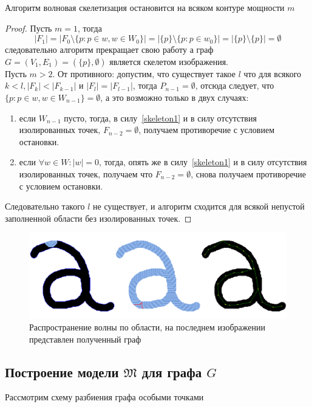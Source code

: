 \begin{state} 
Алгоритм волновая скелетизация остановится на всяком контуре мощности $m$
\end{state}

\begin{proof}
Пусть $m=1$, тогда 
$$|F_1|=|F_0\setminus\{p:p\in w, w\in W_0\}| = |\{p\}\setminus\{p:p\in w_0\}|=|\{p\}\setminus\{p\}|=\emptyset$$
следовательно алгоритм прекращает свою работу а граф $G=(V_1,E_1)=(\{p\},\emptyset)$ является скелетом изображения.\\Пусть $m>2$. От противного: допустим, что существует такое $l$ что для всякого $k<l,|F_{k}| < |F_{k-1}|$ и $|F_{l}|=|F_{l-1}|$, тогда $P_{n-1}=\emptyset$, отсюда следует, что $\{p : p\in w, w \in W_{n-1}\}=\emptyset$, а это возможно только в двух случаях:\\
\begin{enumerate}
\item если $W_{n-1}$ пусто, тогда, в силу~\ref{skeleton1} и в силу отсутствия изолированных точек, $F_{n-2}=\emptyset$, получаем противоречие с условием остановки.\\
\item если $\forall w\in W:|w|=0$, тогда, опять же в силу~\ref{skeleton1} и в силу отсутствия изолированных точек, получаем что $F_{n-2}=\emptyset$, снова получаем противоречие с условием остановки.\\
\end{enumerate}
Следовательно такого $l$ не существует, и алгоритм сходится для всякой непустой заполненной области без изолированных точек.
\end{proof}
\begin{figure}[h]
\centering
\includegraphics[width=\linewidth,keepaspectratio]{images/th_wave_graph}
\caption{Распространение волны по области, на последнем изображении представлен полученный граф}
\end{figure}

\subsection{Построение модели  $\mathfrak{M}$ для графа $G$}
Рассмотрим схему разбиения графа особыми точками

